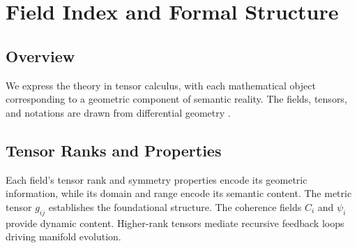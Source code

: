\chapter{Field Index and Formal Structure}

\section{Overview}

We express the theory in tensor calculus, with each mathematical object corresponding to a geometric component of semantic reality. The fields, tensors, and notations are drawn from differential geometry \autocite{Riemann1868, Lee2003}.

\section{Tensor Ranks and Properties}

Each field's tensor rank and symmetry properties encode its geometric information, while its domain and range encode its semantic content. The metric tensor \(g_{ij}\) establishes the foundational structure. The coherence fields \(C_i\) and \(\psi_i\) provide dynamic content. Higher-rank tensors mediate recursive feedback loops driving manifold evolution.

